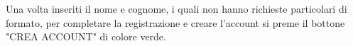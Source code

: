 Una volta inseriti il nome e cognome, i quali non hanno richieste particolari di formato, per completare la registrazione e creare l'account si preme il bottone "CREA ACCOUNT" di colore verde.

